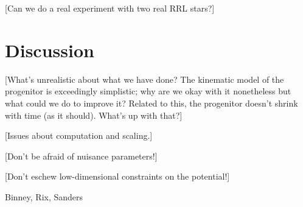 \documentclass[letterpaper,12pt,preprint]{aastex}
\begin{document}
[Can we do a real experiment with two real RRL stars?]

\section{Discussion}

[What's unrealistic about what we have done?  The kinematic model of
  the progenitor is exceedingly simplistic; why are we okay with it
  nonetheless but what could we do to improve it?  Related to this,
  the progenitor doesn't shrink with time (as it should).  What's up
  with that?]

[Issues about computation and scaling.]

[Don't be afraid of nuisance parameters!]

[Don't eschew low-dimensional constraints on the potential!]

\acknowledgements
Binney, Rix, Sanders
\end{document}
